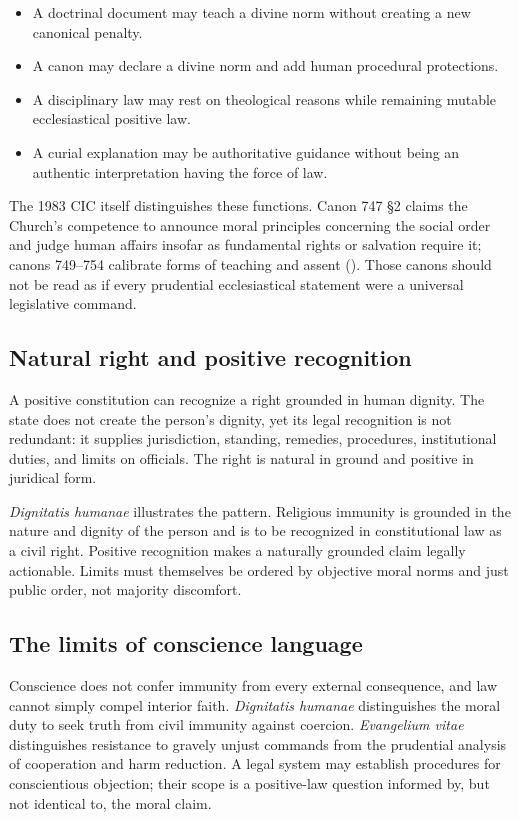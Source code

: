 \begin{itemize}
\item A doctrinal document may teach a divine norm without creating a new canonical penalty.
\item A canon may declare a divine norm and add human procedural protections.
\item A disciplinary law may rest on theological reasons while remaining mutable ecclesiastical positive law.
\item A curial explanation may be authoritative guidance without being an authentic interpretation having the force of law.
\end{itemize}

The 1983 CIC itself distinguishes these functions. Canon 747 \S2 claims the Church's competence to announce moral principles concerning the social order and judge human affairs insofar as fundamental rights or salvation require it; canons 749--754 calibrate forms of teaching and assent (). Those canons should not be read as if every prudential ecclesiastical statement were a universal legislative command.

\subsection{Natural right and positive recognition}

A positive constitution can recognize a right grounded in human dignity. The state does not create the person's dignity, yet its legal recognition is not redundant: it supplies jurisdiction, standing, remedies, procedures, institutional duties, and limits on officials. The right is natural in ground and positive in juridical form.

\emph{Dignitatis humanae} illustrates the pattern. Religious immunity is grounded in the nature and dignity of the person and is to be recognized in constitutional law as a civil right. Positive recognition makes a naturally grounded claim legally actionable. Limits must themselves be ordered by objective moral norms and just public order, not majority discomfort.

\subsection{The limits of conscience language}

Conscience does not confer immunity from every external consequence, and law cannot simply compel interior faith. \emph{Dignitatis humanae} distinguishes the moral duty to seek truth from civil immunity against coercion. \emph{Evangelium vitae} distinguishes resistance to gravely unjust commands from the prudential analysis of cooperation and harm reduction. A legal system may establish procedures for conscientious objection; their scope is a positive-law question informed by, but not identical to, the moral claim.

